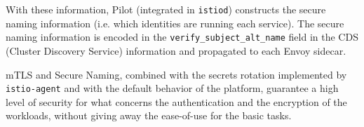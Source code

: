 With these information, Pilot (integrated in \texttt{istiod}) constructs the secure naming information (i.e. which identities are running each service). The secure naming information is encoded in the \texttt{verify\_subject\_alt\_name} field in the CDS (Cluster Discovery Service) information and propagated to each Envoy sidecar.

mTLS and Secure Naming, combined with the secrets rotation implemented by \texttt{istio-agent} and with the default behavior of the platform, guarantee a high level of security for what concerns the authentication and the encryption of the workloads, without giving away the ease-of-use for the basic tasks.  